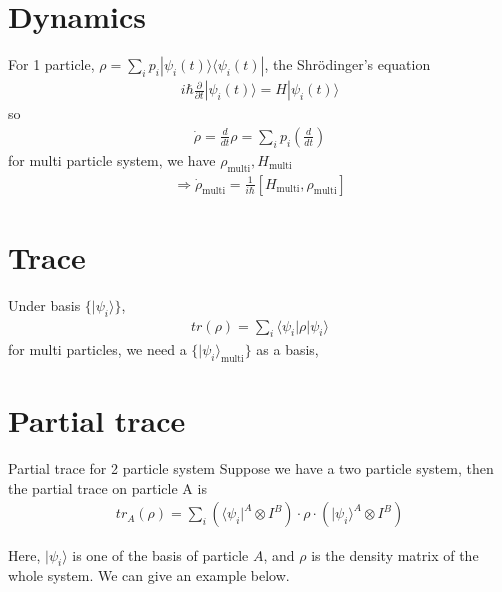 \documentclass[UTF8,12pt]{article} %
\begin{document}
\section{Dynamics}

For 1 particle, $\rho = \sum_{i} p_{i} |\psi_{i}(t)\rangle\langle\psi_{i}(t)|$, the Shr\"{o}dinger's equation
\begin{align}
i\hbar\frac{\partial}{\partial t}|\psi_{i}(t)\rangle = H|\psi_{i}(t)\rangle
\end{align}
so
\begin{align}
\dot{\rho} = \frac{d}{dt} \rho = \sum_{i} p_{i}\left(\frac{d}{dt}\right)
\end{align}
for multi particle system, we have $\rho_{\text{multi}}, H_{\text{multi}}$
\begin{align}
\Rightarrow \dot{\rho}_{\text{multi}} = \frac{1}{i\hbar}[H_{\text{multi}},\rho_{\text{multi}}]
\end{align}

\section{Trace}

Under basis $\{|\psi_{i}\rangle\}$,
\begin{align}
tr(\rho) = \sum_{i}\langle\psi_{i}|\rho|\psi_{i}\rangle
\end{align}
for multi particles, we need a $\{|\psi_{i}\rangle_{\text{multi}}\}$ as a basis,

\section{Partial trace}

\begin{definition}{Partial trace for 2 particle system}{}
Suppose we have a two particle system, then the partial trace on particle A is
\begin{align}
tr_{A}(\rho) = \sum_{i} \left(\langle\psi_{i}|^{A} \otimes I^{B}\right) \cdot \rho \cdot \left(|\psi_{i}\rangle^{A} \otimes I^{B}\right)
\end{align}
\end{definition}

Here, $|\psi_{i}\rangle$ is one of the basis of particle $A$, and $\rho$ is the density matrix of the whole system. We can give an example below.
\end{document}
